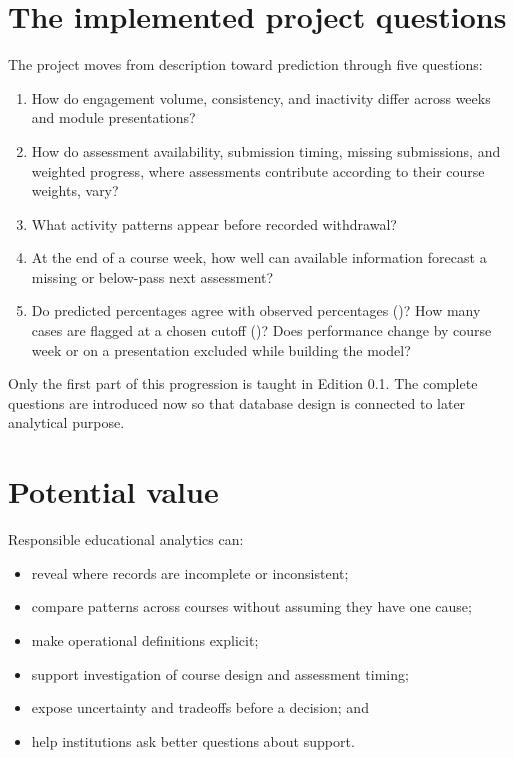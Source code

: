 \section{The implemented project questions}

The project moves from description toward prediction through five questions:

\begin{enumerate}
  \item How do engagement volume, consistency, and inactivity differ across
    weeks and module presentations?
  \item How do assessment availability, submission timing, missing submissions,
    and weighted progress, where assessments contribute according to their
    course weights, vary?
  \item What activity patterns appear before recorded withdrawal?
  \item At the end of a course week, how well can available information forecast
    a missing or below-pass next assessment?
  \item Do predicted percentages agree with observed percentages
    ()? How many cases are flagged at a chosen cutoff
    ()? Does performance change by course week or on a
    presentation excluded while building the model?
\end{enumerate}

Only the first part of this progression is taught in Edition 0.1. The complete
questions are introduced now so that database design is connected to later
analytical purpose.

\section{Potential value}

Responsible educational analytics can:
\begin{itemize}
  \item reveal where records are incomplete or inconsistent;
  \item compare patterns across courses without assuming they have one cause;
  \item make operational definitions explicit;
  \item support investigation of course design and assessment timing;
  \item expose uncertainty and tradeoffs before a decision; and
  \item help institutions ask better questions about support.
\end{itemize}

